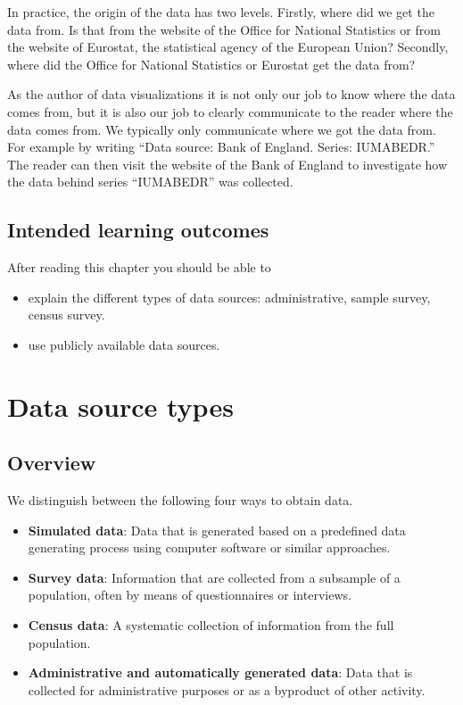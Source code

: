 \documentclass[]{book}
\providecommand{\tightlist}{%
  \setlength{\itemsep}{0pt}\setlength{\parskip}{0pt}}
\begin{document}
In practice, the origin of the data has two levels. Firstly, where did we get the data from. Is that from the website of the Office for National Statistics or from the website of Eurostat, the statistical agency of the European Union? Secondly, where did the Office for National Statistics or Eurostat get the data from?

As the author of data visualizations it is not only our job to know where the data comes from, but it is also our job to clearly communicate to the reader where the data comes from. We typically only communicate where we got the data from. For example by writing ``Data source: Bank of England.
Series: IUMABEDR.'' The reader can then visit the website of the Bank of England to investigate how the data behind series ``IUMABEDR'' was collected.

\hypertarget{intended-learning-outcomes-6}{%
\subsection{Intended learning outcomes}\label{intended-learning-outcomes-6}}

After reading this chapter you should be able to

\begin{itemize}
\tightlist
\item
  explain the different types of data sources: administrative, sample survey, census survey.
\item
  use publicly available data sources.
\end{itemize}

\hypertarget{data-source-types}{%
\section{Data source types}\label{data-source-types}}

\hypertarget{overview}{%
\subsection{Overview}\label{overview}}

We distinguish between the following four ways to obtain data.

\begin{itemize}
\tightlist
\item
  \textbf{Simulated data}: Data that is generated based on a predefined data generating process using computer software or similar approaches.
\item
  \textbf{Survey data}: Information that are collected from a subsample of a population, often by means of questionnaires or interviews.
\item
  \textbf{Census data}: A systematic collection of information from the full population.
\item
  \textbf{Administrative and automatically generated data}: Data that is collected for administrative purposes or as a byproduct of other activity.
\end{itemize}
\end{document}
